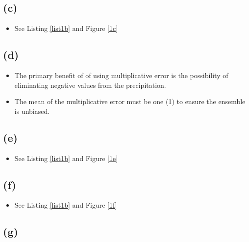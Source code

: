 \documentclass[letterpaper]{tufte-handout}
\begin{document}
  \subsection{(c)}
  \begin{itemize}
    \item See Listing \ref{list1b} and Figure \ref{1c}
  \end{itemize}
  \subsection{(d)}
  \begin{itemize}
    \item The primary benefit of of using multiplicative error is the possibility of eliminating negative values from the precipitation.
    \item The mean of the multiplicative error must be one (1) to ensure the ensemble is unbiased.
  \end{itemize}
  \subsection{(e)}
  \begin{itemize}
    \item See Listing \ref{list1b} and Figure \ref{1e}
  \end{itemize}
  \subsection{(f)}
  \begin{itemize}
    \item See Listing \ref{list1b} and Figure \ref{1f}
  \end{itemize}
  \subsection{(g)}
\end{document}
